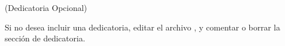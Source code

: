 
(Dedicatoria Opcional)

Si no desea incluir una dedicatoria, editar el archivo , y comentar o borrar la sección de dedicatoria.

